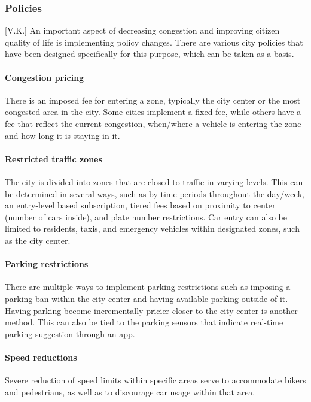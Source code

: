 \documentclass[12pt]{article}                       %
\begin{document}
\subsubsection{Policies}[V.K.]
An important aspect of decreasing congestion and improving citizen quality of life is implementing policy changes. There are various city policies that have been designed specifically for this purpose, which can be taken as a basis. 

\paragraph{Congestion pricing} There is an imposed fee for entering a zone, typically the city center or the most congested area in the city. Some cities implement a fixed fee, while others have a fee that reflect the current congestion, when/where a vehicle is entering the zone and how long it is staying in it.

\paragraph{Restricted traffic zones} The city is divided into zones that are closed to traffic in varying levels. This can be determined in several ways, such as by time periods throughout the day/week, an entry-level based subscription, tiered fees based on proximity to center (number of cars inside), and plate number restrictions. Car entry can also be limited to residents, taxis, and emergency vehicles within designated zones, such as the city center. 

\paragraph{Parking restrictions} There are multiple ways to implement parking restrictions such as imposing a parking ban within the city center and having available parking outside of it. Having parking become incrementally pricier closer to the city center is another method. This can also be tied to the parking sensors that indicate real-time parking suggestion through an app.

\paragraph{Speed reductions} Severe reduction of speed limits within specific areas serve to accommodate bikers and pedestrians, as well as to discourage car usage within that area.
\end{document}
